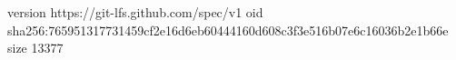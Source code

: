 version https://git-lfs.github.com/spec/v1
oid sha256:765951317731459cf2e16d6eb60444160d608c3f3e516b07e6c16036b2e1b66e
size 13377
